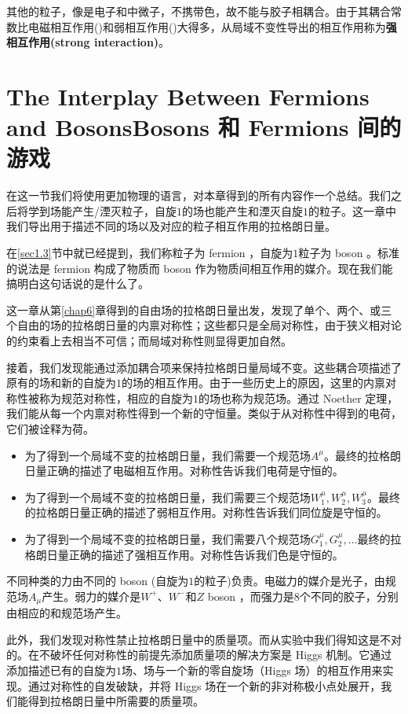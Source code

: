 其他的\spint 粒子，像是电子和中微子，不携带色，故不能与胶子相耦合。由于其耦合常数比电磁相互作用(\uo)和弱相互作用(\sutw)大得多，从局域\suth 不变性导出的相互作用称为{\bfseries 强相互作用(strong interaction)}。

\section[Bosons 和 Fermions 间的游戏]{The Interplay Between Fermions and Bosons\quad Bosons 和 Fermions 间的游戏}\label{sec7.9}

在这一节我们将使用更加物理的语言，对本章得到的所有内容作一个总结。我们之后将学到\spint 场能产生/湮灭\spint 粒子，自旋$1$的场也能产生和湮灭自旋$1$的粒子。这一章中我们导出用于描述不同的场以及对应的粒子相互作用的拉格朗日量。

在\ref{sec1.3}节中就已经提到，我们称\spint 粒子为 fermion ，自旋为$1$粒子为 boson 。标准的说法是 fermion 构成了物质而 boson 作为物质间相互作用的媒介。现在我们能搞明白这句话说的是什么了。

这一章从第\ref{chap6}章得到的自由场的拉格朗日量出发，发现了单个、两个、或三个自由的\spint 场的拉格朗日量的内禀对称性；这些都只是全局对称性，由于狭义相对论的约束看上去相当不可信；而局域对称性则显得更加自然。

接着，我们发现能通过添加耦合项来保持拉格朗日量局域不变。这些耦合项描述了原有的\spint 场和新的自旋为$1$的场的相互作用。由于一些历史上的原因，这里的内禀对称性被称为规范对称性，相应的自旋为$1$的场也称为规范场。通过 Noether 定理，我们能从每一个内禀对称性得到一个新的守恒量。类似于从\uo 对称性中得到的电荷，它们被诠释为荷。

\begin{itemize}
\item 为了得到一个局域\uo 不变的拉格朗日量，我们需要一个规范场$A^\mu$。最终的拉格朗日量正确的描述了电磁相互作用。\uo 对称性告诉我们电荷是守恒的。
\item 为了得到一个局域\sutw 不变的拉格朗日量，我们需要三个规范场$W_1^\mu,W_2^\mu,W_3^\mu$。最终的拉格朗日量正确的描述了弱相互作用。\sutw 对称性告诉我们同位旋是守恒的。
\item 为了得到一个局域\suth 不变的拉格朗日量，我们需要八个规范场$G_1^\mu,G_2^\mu,\dots$最终的拉格朗日量正确的描述了强相互作用。\suth 对称性告诉我们色是守恒的。
\end{itemize}

不同种类的力由不同的 boson (自旋为$1$的粒子)负责。电磁力的媒介是光子，由\uo 规范场$A_\mu$产生。弱力的媒介是$W^+$、$W^-$和$Z$ boson ，而强力是$8$个不同的胶子，分别由相应的\sutw 和\suth 规范场产生。

此外，我们发现\sutw 对称性禁止拉格朗日量中的质量项。而从实验中我们得知这是不对的。在不破坏任何对称性的前提先添加质量项的解决方案是 Higgs 机制。它通过添加描述已有的自旋为$1$场、\spint 场与一个新的零自旋场（Higgs 场）的相互作用来实现。通过\sutw 对称性的自发破缺，并将 Higgs 场在一个新的非对称极小点处展开，我们能得到拉格朗日量中所需要的质量项。
